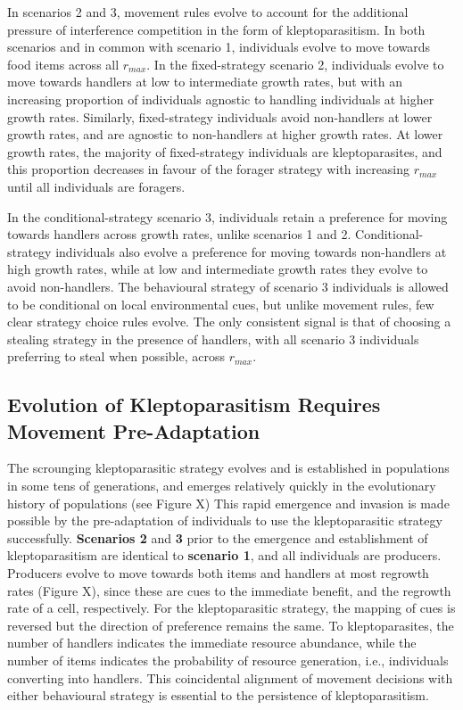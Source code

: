 \documentclass[11pt]{article}
\begin{document}
In scenarios 2 and 3, movement rules evolve to account for the additional pressure of interference competition in the form of kleptoparasitism.
In both scenarios and in common with scenario 1, individuals evolve to move towards food items across all $r_{max}$.
In the fixed-strategy scenario 2, individuals evolve to move towards handlers at low to intermediate growth rates, but with an increasing proportion of individuals agnostic to handling individuals at higher growth rates.
Similarly, fixed-strategy individuals avoid non-handlers at lower growth rates, and are agnostic to non-handlers at higher growth rates.
At lower growth rates, the majority of fixed-strategy individuals are kleptoparasites, and this proportion decreases in favour of the forager strategy with increasing $r_{max}$ until all individuals are foragers.

In the conditional-strategy scenario 3, individuals retain a preference for moving towards handlers across growth rates, unlike scenarios 1 and 2.
Conditional-strategy individuals also evolve a preference for moving towards non-handlers at high growth rates, while at low and intermediate growth rates they evolve to avoid non-handlers.
The behavioural strategy of scenario 3 individuals is allowed to be conditional on local environmental cues, but unlike movement rules, few clear strategy choice rules evolve.
The only consistent signal is that of choosing a stealing strategy in the presence of handlers, with all scenario 3 individuals preferring to steal when possible, across $r_{max}$.

\subsection{Evolution of Kleptoparasitism Requires Movement Pre-Adaptation}

The scrounging kleptoparasitic strategy evolves and is established in populations in some tens of generations, and emerges relatively quickly in the evolutionary history of populations (see Figure X)
This rapid emergence and invasion is made possible by the pre-adaptation of individuals to use the kleptoparasitic strategy successfully.
\textbf{Scenarios 2} and \textbf{3} prior to the emergence and establishment of kleptoparasitism are identical to \textbf{scenario 1}, and all individuals are producers.
Producers evolve to move towards both items and handlers at most regrowth rates (Figure X), since these are cues to the immediate benefit, and the regrowth rate of a cell, respectively.
For the kleptoparasitic strategy, the mapping of cues is reversed but the direction of preference remains the same.
To kleptoparasites, the number of handlers indicates the immediate resource abundance, while the number of items indicates the probability of resource generation, i.e., individuals converting into handlers.
This coincidental alignment of movement decisions with either behavioural strategy is essential to the persistence of kleptoparasitism.
\end{document}
